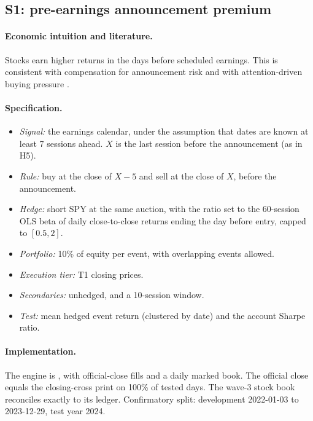 \documentclass[../main.tex]{subfiles}
\begin{document}
\subsection{S1: pre-earnings announcement premium}\label{sec:s1}

\paragraph{Economic intuition and literature.}
Stocks earn higher returns in the days before scheduled earnings. This is consistent with compensation for announcement risk and with attention-driven buying pressure \citep{frazzini2007,barber2013}.

\paragraph{Specification.}
\begin{itemize}
\item \emph{Signal:} the earnings calendar, under the assumption that dates are known at least 7 sessions ahead. $X$ is the last session before the announcement (as in H5).
\item \emph{Rule:} buy at the close of $X-5$ and sell at the close of $X$, before the announcement.
\item \emph{Hedge:} short SPY at the same auction, with the ratio set to the 60-session OLS beta of daily close-to-close returns ending the day before entry, capped to $[0.5, 2]$.
\item \emph{Portfolio:} 10\% of equity per event, with overlapping events allowed.
\item \emph{Execution tier:} T1 closing prices.
\item \emph{Secondaries:} unhedged, and a 10-session window.
\item \emph{Test:} mean hedged event return (clustered by date) and the account Sharpe ratio.
\end{itemize}

\paragraph{Implementation.}
The engine is , with official-close fills and a daily marked book. The official close equals the closing-cross print on 100\% of tested days. The wave-3 stock book reconciles exactly to its ledger. Confirmatory split: development 2022-01-03 to 2023-12-29, test year 2024.
\end{document}
